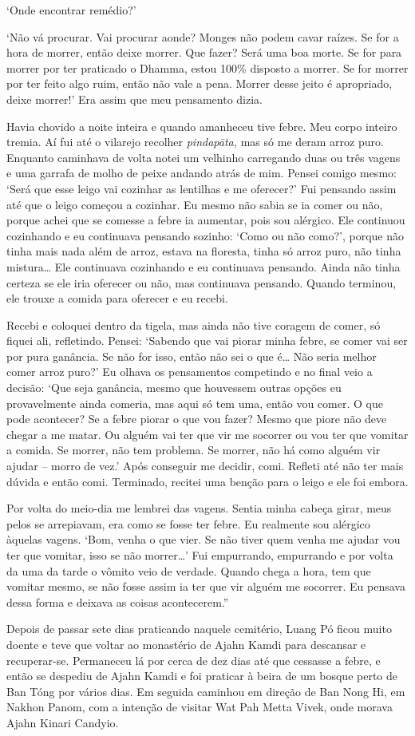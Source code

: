 `Onde encontrar remédio?'

`Não vá procurar. Vai procurar aonde? Monges não podem cavar raízes. Se
for a hora de morrer, então deixe morrer. Que fazer? Será uma boa morte.
Se for para morrer por ter praticado o Dhamma, estou 100\% disposto a
morrer. Se for morrer por ter feito algo ruim, então não vale a pena.
Morrer desse jeito é apropriado, deixe morrer!' Era assim que meu
pensamento dizia.

Havia chovido a noite inteira e quando amanheceu tive febre. Meu corpo
inteiro tremia. Aí fui até o vilarejo recolher \emph{pindapāta,} mas só
me deram arroz puro. Enquanto caminhava de volta notei um velhinho
carregando duas ou três vagens e uma garrafa de molho de peixe andando
atrás de mim. Pensei comigo mesmo: `Será que esse leigo vai cozinhar as
lentilhas e me oferecer?' Fui pensando assim até que o leigo começou a
cozinhar. Eu mesmo não sabia se ia comer ou não, porque achei que se
comesse a febre ia aumentar, pois sou alérgico. Ele continuou cozinhando
e eu continuava pensando sozinho: `Como ou não como?', porque não tinha
mais nada além de arroz, estava na floresta, tinha só arroz puro, não
tinha mistura\ldots{} Ele continuava cozinhando e eu continuava
pensando. Ainda não tinha certeza se ele iria oferecer ou não, mas
continuava pensando. Quando terminou, ele trouxe a comida para oferecer
e eu recebi.

Recebi e coloquei dentro da tigela, mas ainda não tive coragem de comer,
só fiquei ali, refletindo. Pensei: `Sabendo que vai piorar minha febre,
se comer vai ser por pura ganância. Se não for isso, então não sei o que
é\ldots{} Não seria melhor comer arroz puro?' Eu olhava os pensamentos
competindo e no final veio a decisão: `Que seja ganância, mesmo que
houvessem outras opções eu provavelmente ainda comeria, mas aqui só tem
uma, então vou comer. O que pode acontecer? Se a febre piorar o que vou
fazer? Mesmo que piore não deve chegar a me matar. Ou alguém vai ter que
vir me socorrer ou vou ter que vomitar a comida. Se morrer, não tem
problema. Se morrer, não há como alguém vir ajudar -- morro de vez.'
Após conseguir me decidir, comi. Refleti até não ter mais dúvida e então
comi. Terminado, recitei uma benção para o leigo e ele foi embora.

Por volta do meio-dia me lembrei das vagens. Sentia minha cabeça girar,
meus pelos se arrepiavam, era como se fosse ter febre. Eu realmente sou
alérgico àquelas vagens. `Bom, venha o que vier. Se não tiver quem venha
me ajudar vou ter que vomitar, isso se não morrer\ldots{}' Fui
empurrando, empurrando e por volta da uma da tarde o vômito veio de
verdade. Quando chega a hora, tem que vomitar mesmo, se não fosse assim
ia ter que vir alguém me socorrer. Eu pensava dessa forma e deixava as
coisas acontecerem.''

Depois de passar sete dias praticando naquele cemitério, Luang Pó
ficou muito doente e teve que voltar ao monastério de Ajahn Kamdi para
descansar e recuperar-se. Permaneceu lá por cerca de dez dias até que
cessasse a febre, e então se despediu de Ajahn Kamdi e foi praticar à
beira de um bosque perto de Ban Tóng por vários dias. Em seguida
caminhou em direção de Ban Nong Hi, em Nakhon Panom, com a intenção de
visitar Wat Pah Metta Vivek, onde morava Ajahn Kinari Candyio.
